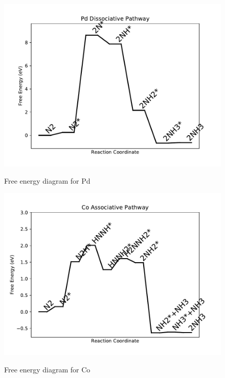 \documentclass{article}
\begin{document}
\begin{figure}
\includegraphics[width=1\linewidth]{data/plots/Pd_dissociative.pdf}
\label{fig:Pd_dissociative}
\caption{Free energy diagram for Pd}
\end{figure}

\begin{figure}
\includegraphics[width=1\linewidth]{data/plots/Co_associative.pdf}
\label{fig:Co_associative}
\caption{Free energy diagram for Co}
\end{figure}
\end{document}
